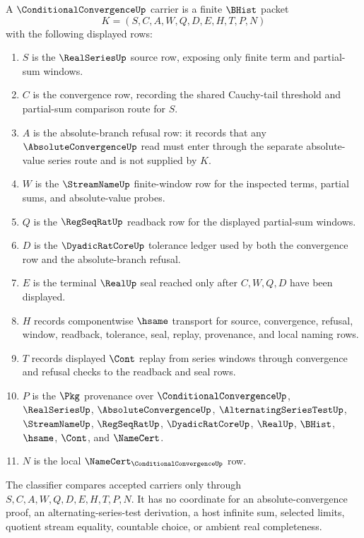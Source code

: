 \begin{definition}
\label{def:conditional-convergence-carrier}
A $\ConditionalConvergenceUp$ carrier is a finite $\BHist$ packet
$$
K=(S,C,A,W,Q,D,E,H,T,P,N)
$$
with the following displayed rows:
\begin{enumerate}
\item $S$ is the $\RealSeriesUp$ source row, exposing only finite term and partial-sum windows.
\item $C$ is the convergence row, recording the shared Cauchy-tail threshold and partial-sum comparison route for $S$.
\item $A$ is the absolute-branch refusal row: it records that any $\AbsoluteConvergenceUp$ read must enter through the separate absolute-value series route and is not supplied by $K$.
\item $W$ is the $\StreamNameUp$ finite-window row for the inspected terms, partial sums, and absolute-value probes.
\item $Q$ is the $\RegSeqRatUp$ readback row for the displayed partial-sum windows.
\item $D$ is the $\DyadicRatCoreUp$ tolerance ledger used by both the convergence row and the absolute-branch refusal.
\item $E$ is the terminal $\RealUp$ seal reached only after $C,W,Q,D$ have been displayed.
\item $H$ records componentwise $\hsame$ transport for source, convergence, refusal, window, readback, tolerance, seal, replay, provenance, and local naming rows.
\item $T$ records displayed $\Cont$ replay from series windows through convergence and refusal checks to the readback and seal rows.
\item $P$ is the $\Pkg$ provenance over $\ConditionalConvergenceUp$, $\RealSeriesUp$, $\AbsoluteConvergenceUp$, $\AlternatingSeriesTestUp$, $\StreamNameUp$, $\RegSeqRatUp$, $\DyadicRatCoreUp$, $\RealUp$, $\BHist$, $\hsame$, $\Cont$, and $\NameCert$.
\item $N$ is the local $\NameCert_{\ConditionalConvergenceUp}$ row.
\end{enumerate}
The classifier compares accepted carriers only through $S,C,A,W,Q,D,E,H,T,P,N$. It has no coordinate for an absolute-convergence proof, an alternating-series-test derivation, a host infinite sum, selected limits, quotient stream equality, countable choice, or ambient real completeness.
\end{definition}

